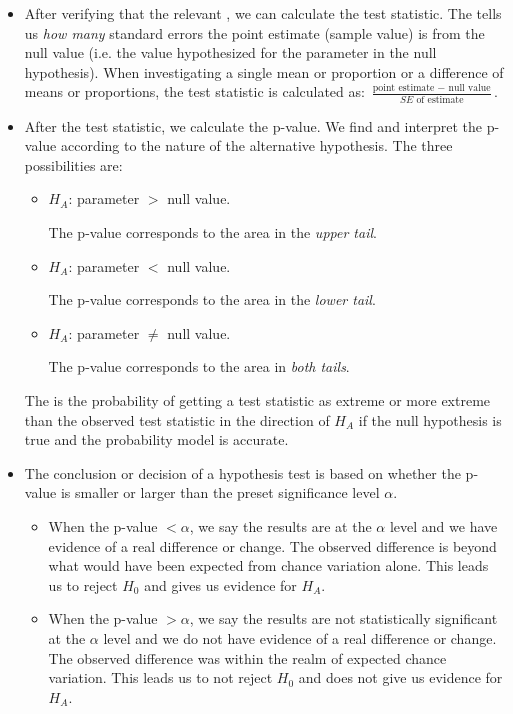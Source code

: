 \begin{itemize}
\item After verifying that the relevant , we can calculate the test statistic.  The  tells us \textit{how many} standard errors the point estimate (sample value) is from the null value (i.e. the value hypothesized for the parameter in the null hypothesis).  When investigating a single mean or proportion or a difference of means or proportions, the test statistic is calculated as: $\frac{\text{point estimate } -\text{ null value}}{SE \text{ of estimate}}$.

\item After the test statistic, we calculate the p-value.  We find and interpret the p-value according to the nature of the alternative hypothesis.  The three possibilities are:\vspace{-1mm}
\begin{itemize}
\item[] $H_A$: parameter $>$ null value. \quad\parbox[t]{3.84in}{The p-value corresponds to the area in the \emph{upper tail}.  }
\item[] $H_A$: parameter $<$ null value. \quad\parbox[t]{3.84in}{The p-value corresponds to the area in the \emph{lower tail}.  }
\item[] $H_A$: parameter $\ne$ null value. \quad\parbox[t]{3.84in}{The p-value corresponds to the area in \emph{both tails}.  }
\end{itemize}
The  is the probability of getting a test statistic as extreme or more extreme than the observed test statistic in the direction of $H_A$ if the null hypothesis is true and the probability model is accurate.

\item The conclusion or decision of a hypothesis test is based on whether the p-value is smaller or larger than the preset significance level $\alpha$. \vspace{-1mm}
\begin{itemize}
\item When the  p-value $< \alpha$, we say the results are  at the $\alpha$ level and we have evidence of a real difference or change.  The observed difference is beyond what would have been expected from chance variation alone.  This leads us to reject $H_0$ and gives us evidence for $H_A$.
\item When the  p-value $> \alpha$, we say the results are not statistically significant at the $\alpha$ level and we do not have evidence of a real difference or change.  The observed difference was within the realm of expected chance variation.  This leads us to not reject $H_0$ and does not give us evidence for $H_A$.
\end{itemize}


\end{itemize}
